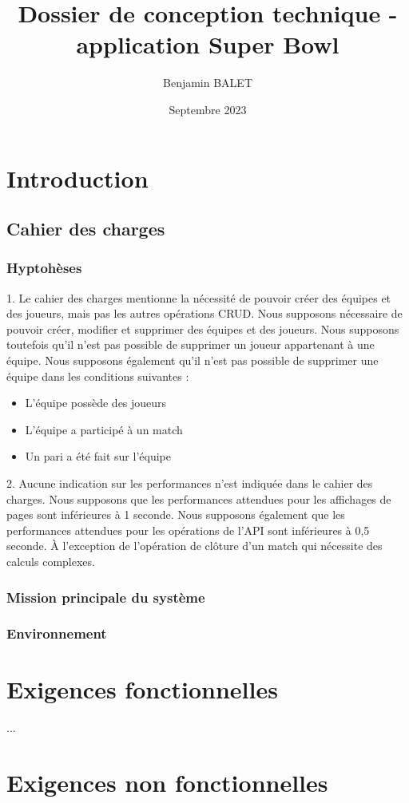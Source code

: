 \documentclass{book}
\title{Dossier de conception technique - application Super Bowl}
\author{Benjamin BALET}
\date{Septembre 2023}
\begin{document}
\maketitle{}
\tableofcontents
\newpage

\chapter{Introduction}

\section{Cahier des charges}

\subsection{Hyptohèses}

1. Le cahier des charges mentionne la nécessité de pouvoir créer des équipes et des joueurs, mais pas les autres opérations CRUD. 
Nous supposons nécessaire de pouvoir créer, modifier et supprimer des équipes et des joueurs.
Nous supposons toutefois qu'il n'est pas possible de supprimer un joueur appartenant à une équipe.
Nous supposons également qu'il n'est pas possible de supprimer une équipe dans les conditions suivantes :
\begin{itemize}
    \item L'équipe possède des joueurs
    \item L'équipe a participé à un match
    \item Un pari a été fait sur l'équipe
\end{itemize}

2. Aucune indication sur les performances n'est indiquée dans le cahier des charges. Nous supposons que les performances
attendues pour les affichages de pages sont inférieures à 1 seconde. Nous supposons également que les performances attendues
pour les opérations de l'API sont inférieures à 0,5 seconde. À l'exception de l'opération de clôture d'un match qui nécessite
des calculs complexes.

\subsection{Mission principale du système}

\subsection{Environnement}

\chapter{Exigences fonctionnelles}

\begin{landscape}
  
  ...


\end{landscape}

\chapter{Exigences non fonctionnelles}




\begin{appendix}
    \listoffigures
    \listoftables
  \end{appendix}
\end{document}

